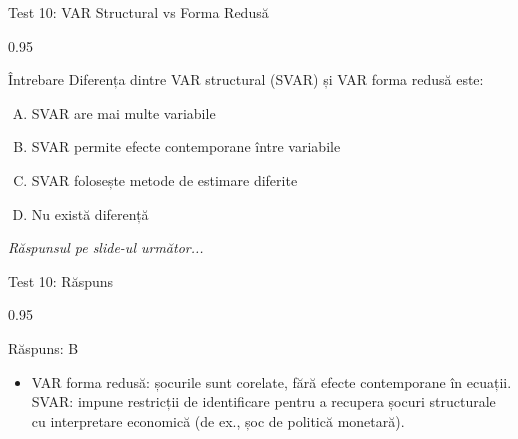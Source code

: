\documentclass[9pt, aspectratio=169, t]{beamer}
\begin{document}
\begin{frame}{Test 10: VAR Structural vs Forma Redusă}
    \begin{cminipage}{0.95\textwidth}
    \begin{alertblock}{Întrebare}
        Diferența dintre VAR structural (SVAR) și VAR forma redusă este:
    \end{alertblock}

    \vspace{0.3cm}

    \begin{enumerate}[A)]\setlength{\itemsep}{0pt}
        \item SVAR are mai multe variabile
        \item SVAR permite efecte contemporane între variabile
        \item SVAR folosește metode de estimare diferite
        \item Nu există diferență
    \end{enumerate}

    \vspace{0.5cm}
    \begin{flushright}\textit{Răspunsul pe slide-ul următor...}\end{flushright}
    \end{cminipage}
\end{frame}

\begin{frame}{Test 10: Răspuns}
    \begin{cminipage}{0.95\textwidth}
    \begin{exampleblock}{Răspuns: B}
        \begin{itemize}\setlength{\itemsep}{0pt}
            \item VAR forma redusă: șocurile sunt corelate, fără efecte contemporane în ecuații. SVAR: impune restricții de identificare pentru a recupera șocuri structurale cu interpretare economică (de ex., șoc de politică monetară).
        \end{itemize}
    \end{exampleblock}
    \end{cminipage}
\end{frame}
\end{document}
